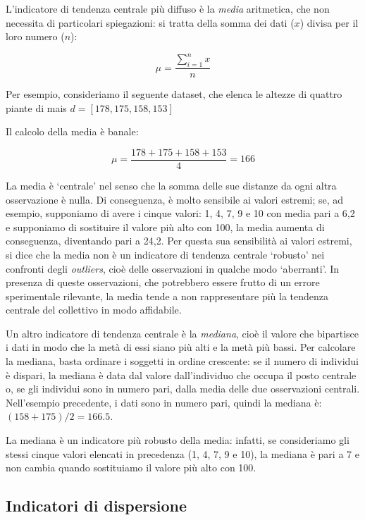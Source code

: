 \documentclass[
  12pt,
]{book}
\begin{document}
L'indicatore di tendenza centrale più diffuso è la \emph{media} aritmetica, che non necessita di particolari spiegazioni: si tratta della somma dei dati (\(x\)) divisa per il loro numero (\(n\)):

\[\mu = \frac{\sum\limits_{i = 1}^n x}{n}\]

Per esempio, consideriamo il seguente dataset, che elenca le altezze di quattro piante di mais \(d = [178, 175, 158, 153]\)

Il calcolo della media è banale:

\[\mu = \frac{178 + 175 + 158 + 153}{4} = 166\]

La media è `centrale' nel senso che la somma delle sue distanze da ogni altra osservazione è nulla. Di conseguenza, è molto sensibile ai valori estremi; se, ad esempio, supponiamo di avere i cinque valori: 1, 4, 7, 9 e 10 con media pari a 6,2 e supponiamo di sostituire il valore più alto con 100, la media aumenta di conseguenza, diventando pari a 24,2. Per questa sua sensibilità ai valori estremi, si dice che la media non è un indicatore di tendenza centrale `robusto' nei confronti degli \emph{outliers}, cioè delle osservazioni in qualche modo `aberranti'. In presenza di queste osservazioni, che potrebbero essere frutto di un errore sperimentale rilevante, la media tende a non rappresentare più la tendenza centrale del collettivo in modo affidabile.

Un altro indicatore di tendenza centrale è la \emph{mediana}, cioè il valore che bipartisce i dati in modo che la metà di essi siano più alti e la metà più bassi. Per calcolare la mediana, basta ordinare i soggetti in ordine crescente: se il numero di individui è dispari, la mediana è data dal valore dall'individuo che occupa il posto centrale o, se gli individui sono in numero pari, dalla media delle due osservazioni centrali. Nell'esempio precedente, i dati sono in numero pari, quindi la mediana è: \((158 + 175)/2 = 166.5\).

La mediana è un indicatore più robusto della media: infatti, se consideriamo gli stessi cinque valori elencati in precedenza (1, 4, 7, 9 e 10), la mediana è pari a 7 e non cambia quando sostituiamo il valore più alto con 100.

\hypertarget{indicatori-di-dispersione}{%
\subsection{Indicatori di dispersione}\label{indicatori-di-dispersione}}
\end{document}

